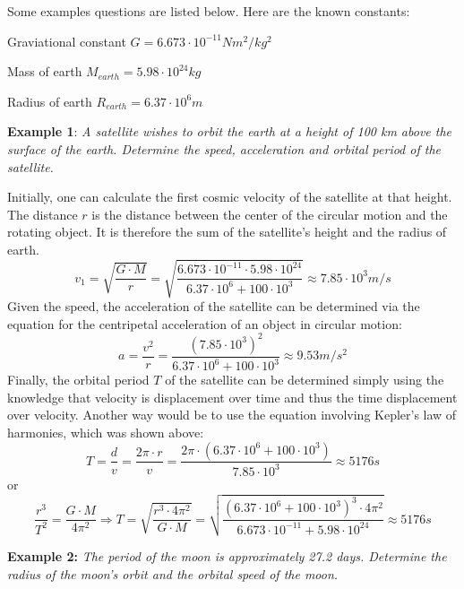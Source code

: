 
Some examples questions are listed below. Here are the known constants:

Graviational constant $G = 6.673 \cdot 10^{-11} N m^2 / kg^2$

Mass of earth $M_{earth} = 5.98 \cdot 10^24 kg$

Radius of earth $R_{earth} = 6.37 \cdot 10^6 m$

\textbf{Example 1}: \emph{A satellite wishes to orbit the earth at a height of 100 km above the surface of the earth. Determine the speed, acceleration and orbital period of the satellite.}

Initially, one can calculate the first cosmic velocity of the satellite at that height. The distance $r$ is the distance between the center of the circular motion and the rotating object. It is therefore the sum of the satellite's height and the radius of earth. $$v_1 = \sqrt{\frac{G \cdot M}{r}} = \sqrt{\frac{6.673 \cdot 10^{-11} \cdot 5.98 \cdot 10^24}{6.37 \cdot 10^6 + 100 \cdot 10^3}} \approx 7.85 \cdot 10^3 m/s$$ Given the speed, the acceleration of the satellite can be determined via the equation for the centripetal acceleration of an object in circular motion: $$a = \frac{v^2}{r} = \frac{(7.85 \cdot 10^3)^2}{6.37 \cdot 10^6 + 100 \cdot 10^3} \approx 9.53 m/s^2$$ Finally, the orbital period $T$ of the satellite can be determined simply using the knowledge that velocity is displacement over time and thus the time displacement over velocity. Another way would be to use the equation involving Kepler's law of harmonies, which was shown above: $$T = \frac{d}{v} = \frac{2 \pi \cdot r}{v} = \frac{2 \pi \cdot (6.37 \cdot 10^6 + 100 \cdot 10^3)}{7.85 \cdot 10^3} \approx 5176 s$$ or $$\frac{r^3}{T^2} = \frac{G \cdot M}{4 \pi^2} \Rightarrow T = \sqrt{\frac{r^3 \cdot 4 \pi^2}{G \cdot M}} = \sqrt{\frac{(6.37 \cdot 10^6 + 100 \cdot 10^3)^3 \cdot 4 \pi^2}{6.673 \cdot 10^{-11} + 5.98 \cdot 10^24}} \approx 5176 s$$

\textbf{Example 2:} \emph{The period of the moon is approximately 27.2 days. Determine the radius of the moon's orbit and the orbital speed of the moon.}

